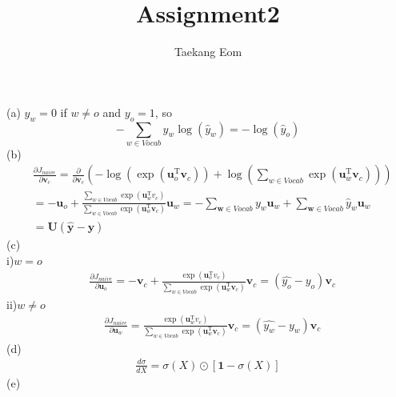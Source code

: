 \documentclass[11pt]{article}
\title{ Assignment2}
\author{Taekang Eom}
\begin{document}
\maketitle
\thispagestyle{empty}
(a) $y_{w}=0$ if $w\ne o$ and $y_{o}=1$, so 
\begin{displaymath}
-\sum_{w\in Vocab}y_{w}\log(\hat{y}_{w})=-\log(\hat{y}_{o}) 
\end{displaymath}
(b)
\begin{align*}
&\frac{\partial J_{naive}}{\partial \boldsymbol{v}_{c}}=
\frac{\partial}{\partial \boldsymbol{v}_{c}}\left(-\log\left(\exp(\boldsymbol{u}_{o}^{\mathrm{T}}\boldsymbol{v}_{c})\right)+ 
\log\left(\sum_{w\in Vocab}\exp(\boldsymbol{u}_{w}^{\mathrm{T}}\boldsymbol{v}_{c})\right)\right)\\
&= -\boldsymbol{u}_{o}+\frac{\sum_{w\in Vocab}\exp(\boldsymbol{u}_{w}^{\mathrm{T}}v_{c})}{\sum_{w\in Vocab}\exp(\boldsymbol{u}_{w}^{\mathrm{T}}\boldsymbol{v}_{c})}\boldsymbol{u}_{w}
=-\sum_{\boldsymbol{w}\in Vocab}y_{w}\boldsymbol{u}_{w}+\sum_{\boldsymbol{w}\in Vocab}\hat{y}_{w}\boldsymbol{u}_{w}\\
&=\boldsymbol{U}(\hat{\boldsymbol{y}}-\boldsymbol{y})
\end{align*}
(c)\\
i)$w=o$
\begin{align*}
&\frac{\partial J_{naive}}{\partial \boldsymbol{u}_{o}}
= -\boldsymbol{v}_{c}+\frac{\exp(\boldsymbol{u}_{o}^{\mathrm{T}}v_{c})}{\sum_{w\in Vocab}\exp(\boldsymbol{u}_{w}^{\mathrm{T}}\boldsymbol{v}_{c})}\boldsymbol{v}_{c}
=(\hat{y_{o}}-y_{o})\boldsymbol{v}_{c}
\end{align*}
ii)$w\ne o$
\begin{align*}
&\frac{\partial J_{naive}}{\partial \boldsymbol{u}_{w}}
= \frac{\exp(\boldsymbol{u}_{w}^{\mathrm{T}}v_{c})}{\sum_{w\in Vocab}\exp(\boldsymbol{u}_{w}^{\mathrm{T}}\boldsymbol{v}_{c})}\boldsymbol{v}_{c}
=(\hat{y_{w}}-y_{w})\boldsymbol{v}_{c}
\end{align*}
(d)
\begin{align*}
\frac{d\sigma}{dX}= \sigma(X)\odot[\textbf{1} - \sigma(X)]
\end{align*}
(e)
\end{document}
